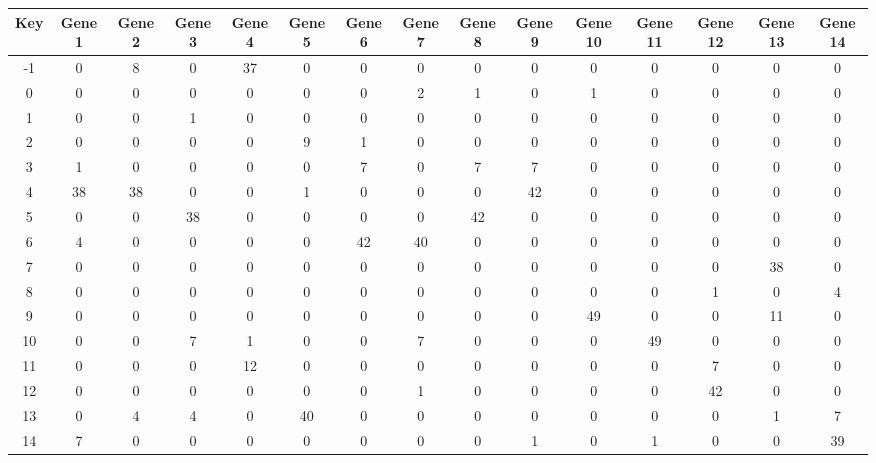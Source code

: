 \begin{tabular}{|c|c|c|c|c|c|c|c|c|c|c|c|c|c|c|}
\hline
Key & Gene 1 & Gene 2 & Gene 3 & Gene 4 & Gene 5 & Gene 6 & Gene 7 & Gene 8 & Gene 9 & Gene 10 & Gene 11 & Gene 12 & Gene 13 & Gene 14 \\
\hline
-1 & 0 & 8 & 0 & 37 & 0 & 0 & 0 & 0 & 0 & 0 & 0 & 0 & 0 & 0 \\
0 & 0 & 0 & 0 & 0 & 0 & 0 & 2 & 1 & 0 & 1 & 0 & 0 & 0 & 0 \\
1 & 0 & 0 & 1 & 0 & 0 & 0 & 0 & 0 & 0 & 0 & 0 & 0 & 0 & 0 \\
2 & 0 & 0 & 0 & 0 & 9 & 1 & 0 & 0 & 0 & 0 & 0 & 0 & 0 & 0 \\
3 & 1 & 0 & 0 & 0 & 0 & 7 & 0 & 7 & 7 & 0 & 0 & 0 & 0 & 0 \\
4 & 38 & 38 & 0 & 0 & 1 & 0 & 0 & 0 & 42 & 0 & 0 & 0 & 0 & 0 \\
5 & 0 & 0 & 38 & 0 & 0 & 0 & 0 & 42 & 0 & 0 & 0 & 0 & 0 & 0 \\
6 & 4 & 0 & 0 & 0 & 0 & 42 & 40 & 0 & 0 & 0 & 0 & 0 & 0 & 0 \\
7 & 0 & 0 & 0 & 0 & 0 & 0 & 0 & 0 & 0 & 0 & 0 & 0 & 38 & 0 \\
8 & 0 & 0 & 0 & 0 & 0 & 0 & 0 & 0 & 0 & 0 & 0 & 1 & 0 & 4 \\
9 & 0 & 0 & 0 & 0 & 0 & 0 & 0 & 0 & 0 & 49 & 0 & 0 & 11 & 0 \\
10 & 0 & 0 & 7 & 1 & 0 & 0 & 7 & 0 & 0 & 0 & 49 & 0 & 0 & 0 \\
11 & 0 & 0 & 0 & 12 & 0 & 0 & 0 & 0 & 0 & 0 & 0 & 7 & 0 & 0 \\
12 & 0 & 0 & 0 & 0 & 0 & 0 & 1 & 0 & 0 & 0 & 0 & 42 & 0 & 0 \\
13 & 0 & 4 & 4 & 0 & 40 & 0 & 0 & 0 & 0 & 0 & 0 & 0 & 1 & 7 \\
14 & 7 & 0 & 0 & 0 & 0 & 0 & 0 & 0 & 1 & 0 & 1 & 0 & 0 & 39 \\
\hline
\end{tabular}